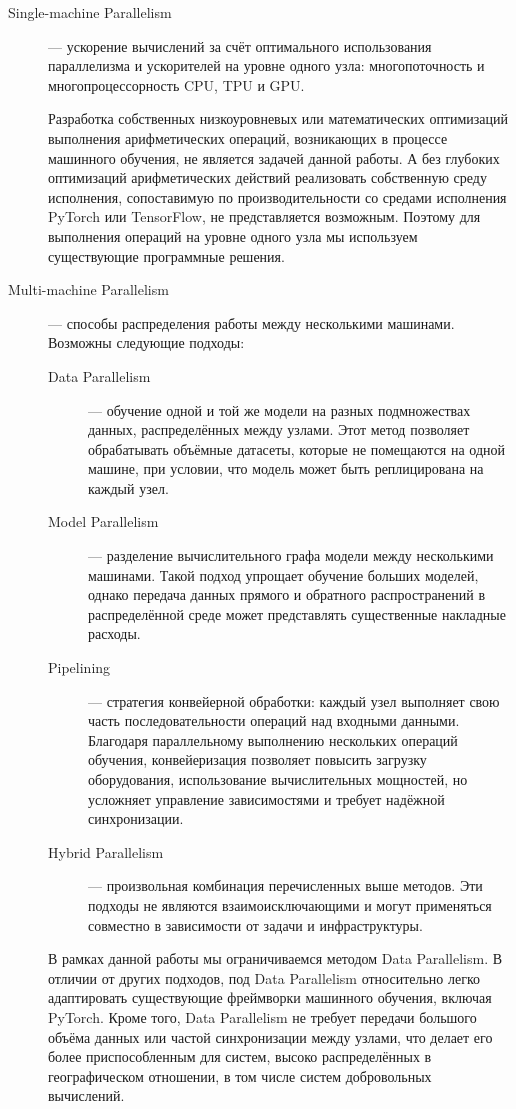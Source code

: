 \documentclass[a4paper,12pt]{extarticle}
\begin{document}
\begin{description}
    \item[Single-machine Parallelism] — ускорение вычислений за счёт оптимального использования параллелизма и ускорителей на уровне одного узла: многопоточность и многопроцессорность CPU, TPU и GPU.
    
    Разработка собственных низкоуровневых или математических оптимизаций выполнения арифметических операций, возникающих в процессе машинного обучения, не является задачей данной работы. А без глубоких оптимизаций арифметических действий реализовать собственную среду исполнения, сопоставимую по производительности со средами исполнения PyTorch или TensorFlow, не представляется возможным. Поэтому для выполнения операций на уровне одного узла мы используем существующие программные решения.

    \item[Multi-machine Parallelism] — способы распределения работы между несколькими машинами. Возможны следующие подходы:
    \begin{description}
        \item[Data Parallelism] — обучение одной и той же модели на разных подмножествах данных, распределённых между узлами. Этот метод позволяет обрабатывать объёмные датасеты, которые не помещаются на одной машине, при условии, что модель может быть реплицирована на каждый узел.
        \item[Model Parallelism] — разделение вычислительного графа модели между несколькими машинами. Такой подход упрощает обучение больших моделей, однако передача данных прямого и обратного распространений в распределённой среде может представлять существенные накладные расходы.
        \item[Pipelining] — стратегия конвейерной обработки: каждый узел выполняет свою часть последовательности операций над входными данными. Благодаря параллельному выполнению нескольких операций обучения, конвейеризация позволяет повысить загрузку оборудования, использование вычислительных мощностей, но усложняет управление зависимостями и требует надёжной синхронизации.
        \item[Hybrid Parallelism] — произвольная комбинация перечисленных выше методов. Эти подходы не являются взаимоисключающими и могут применяться совместно в зависимости от задачи и инфраструктуры.
    \end{description}

    В рамках данной работы мы ограничиваемся методом Data Parallelism. В отличии от других подходов, под Data Parallelism относительно легко адаптировать существующие фреймворки машинного обучения, включая PyTorch. Кроме того, Data Parallelism не требует передачи большого объёма данных или частой синхронизации между узлами, что делает его более приспособленным для систем, высоко распределённых в географическом отношении, в том числе систем добровольных вычислений.


\end{description}
\end{document}
